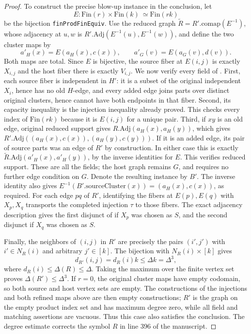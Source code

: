 \begin{proof}
To construct the precise blow-up instance in the conclusion, let
\[
 E:\mathrm{Fin}(r)\times\mathrm{Fin}(k)\ \simeq
   \mathrm{Fin}(rk)
\]
be the bijection \texttt{finProdFinEquiv}.  Use the reduced graph
$\widetilde R=R'.\mathrm{comap}(E^{-1})$, whose adjacency at $u,w$ is
$R'.\mathrm{Adj}(E^{-1}(u),E^{-1}(w))$, and define the two cluster maps by
\[
 a'_H(x)=E(a_H(x),c(x)),\qquad
 a'_G(v)=E(a_G(v),d(v)).
\]
Both maps are total.  Since $E$ is bijective, the source fiber at
$E(i,j)$ is exactly $X_{i,j}$ and the host fiber there is exactly
$V_{i,j}$.  We now verify every field of .
First, each source fiber is independent in $H'$: it is a subset of
the original independent $X_i$, hence has no old $H$-edge, and every
added edge joins parts over distinct original clusters, hence cannot
have both endpoints in that fiber.  Second, its capacity inequality
is the injection inequality already proved.  This checks every index
of $\mathrm{Fin}(rk)$ because it is $E(i,j)$ for a unique pair.
Third, if $xy$ is an old edge, original reduced support gives
$R.\mathrm{Adj}(a_H(x),a_H(y))$, which gives
$R'.\mathrm{Adj}((a_H(x),c(x)),(a_H(y),c(y)))$.  If it is an added
edge, its pair of source parts was an edge of $R'$ by construction.
In either case this is exactly
$\widetilde R.\mathrm{Adj}(a'_H(x),a'_H(y))$, by the inverse identities
for $E$.  This verifies reduced support.  These are all the fields;
the host graph remains $G$, and  requires no
further edge condition on $G$.  Denote the resulting instance by $B'$.
The inverse identity also gives
$E^{-1}(B'.\mathrm{sourceCluster}(x))=(a_H(x),c(x))$, as required.
For each edge $pq$ of $R'$, identifying the fibers at $E(p),E(q)$
with $X_p,X_q$ transports the completed injection $\tau$ to those
fibers.  The exact adjacency description gives the first disjunct
of  if $X_p$ was chosen as $S$, and the
second disjunct if $X_q$ was chosen as $S$.

Finally, the neighbors of $(i,j)$ in $R'$ are precisely the pairs
$(i',j')$ with $i'\in N_R(i)$ and arbitrary $j'\in[k]$.  The bijection
with $N_R(i)\times[k]$ gives
\[
 d_{R'}(i,j)=d_R(i)k\leq\Delta k=\Delta^3,
\]
where $d_R(i)\leq\Delta(R)\leq\Delta$.  Taking the maximum over the
finite vertex set proves $\Delta(R')\leq\Delta^3$.
If $r=0$, the original cluster maps have empty codomain, so both
source and host vertex sets are empty.  The constructions of the
injections and both refined maps above are then empty constructions;
$R'$ is the graph on the empty product index set and has maximum
degree zero, while all field and matching assertions are vacuous.
Thus this case also satisfies the conclusion.  The degree estimate
corrects the symbol $R$ in line 396 of the manuscript.
\end{proof}

